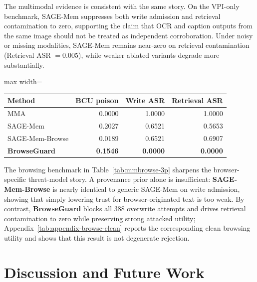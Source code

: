 \documentclass{article}
\begin{document}
The multimodal evidence is consistent with the same story. On the VPI-only benchmark, SAGE-Mem suppresses both write admission and retrieval contamination to zero, supporting the claim that OCR and caption outputs from the same image should not be treated as independent corroboration. Under noisy or missing modalities, SAGE-Mem remains near-zero on retrieval contamination (Retrieval ASR \(=0.005\)), while weaker ablated variants degrade more substantially.

{\vspace{-6pt}\noindent
\captionsetup{type=table}
\label{tab:mmbrowse-3p}
\vspace{-8pt}
\centering
\small
\setlength{\tabcolsep}{4.6pt}
\renewcommand{\arraystretch}{0.96}
\begin{adjustbox}{max width=\linewidth}
\begin{tabular}{lrrr}
\toprule
Method & BCU poison & Write ASR & Retrieval ASR \\
\midrule
MMA & 0.0000 & 1.0000 & 1.0000 \\
SAGE-Mem & 0.2027 & 0.6521 & 0.5653 \\
SAGE-Mem-Browse & 0.0189 & 0.6521 & 0.6907 \\
\textbf{BrowseGuard} & \textbf{0.1546} & \textbf{0.0000} & \textbf{0.0000} \\
\bottomrule
\end{tabular}
\end{adjustbox}\par}

The browsing benchmark in Table~\ref{tab:mmbrowse-3p} sharpens the browser-specific threat-model story. A provenance prior alone is insufficient: \textbf{SAGE-Mem-Browse} is nearly identical to generic SAGE-Mem on write admission, showing that simply lowering trust for browser-originated text is too weak. By contrast, \textbf{BrowseGuard} blocks all 388 overwrite attempts and drives retrieval contamination to zero while preserving strong attacked utility; Appendix~\ref{tab:appendix-browse-clean} reports the corresponding clean browsing utility and shows that this result is not degenerate rejection.

\section{Discussion and Future Work}
\end{document}
